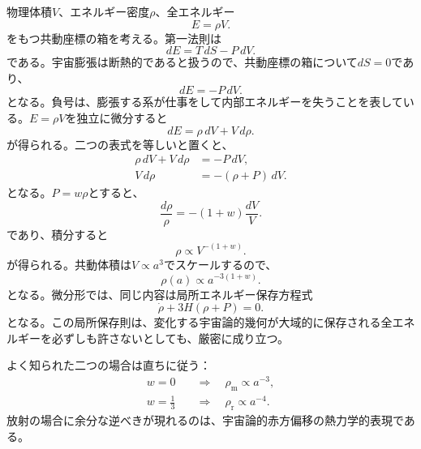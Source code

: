 物理体積\(V\)、エネルギー密度\(\rho\)、全エネルギー\begin{equation}
E=\rho V.
\end{equation}をもつ共動座標の箱を考える。第一法則は
\begin{equation}
dE=T\,dS-P\,dV.
\end{equation}
である。宇宙膨張は断熱的であると扱うので、共動座標の箱について\(dS=0\)であり、
\begin{equation}
dE=-P\,dV.
\label{eq:c04-adiabatic-first-law}
\end{equation}
となる。負号は、膨張する系が仕事をして内部エネルギーを失うことを表している。\(E=\rho V\)を独立に微分すると
\begin{equation}
dE=\rho\,dV+V\,d\rho.
\end{equation}
が得られる。二つの表式を等しいと置くと、
\begin{align}
\rho\,dV+V\,d\rho&=-P\,dV,\\
V\,d\rho&=-(\rho+P)\,dV.
\label{eq:c04-volume-continuity}
\end{align}
となる。\(P=w\rho\)とすると、
\begin{equation}
\frac{d\rho}{\rho}=-(1+w)\frac{dV}{V}.
\end{equation}
であり、積分すると
\begin{equation}
\rho\propto V^{-(1+w)}.
\end{equation}
が得られる。共動体積は\(V\propto a^3\)でスケールするので、
\begin{equation}
\boxed{\rho(a)\propto a^{-3(1+w)}}.
\label{eq:c04-density-scaling}
\end{equation}
となる。微分形では、同じ内容は局所エネルギー保存方程式
\begin{equation}
\dot\rho+3H(\rho+P)=0.
\label{eq:c04-continuity}
\end{equation}
となる。この局所保存則は、変化する宇宙論的幾何が大域的に保存される全エネルギーを必ずしも許さないとしても、厳密に成り立つ。

よく知られた二つの場合は直ちに従う：
\begin{align}
w=0
&\quad\Longrightarrow\quad
\rho_{\mathrm m}\propto a^{-3},\\
w=\frac13
&\quad\Longrightarrow\quad
\rho_{\mathrm r}\propto a^{-4}.
\end{align}
放射の場合に余分な逆べきが現れるのは、宇宙論的赤方偏移の熱力学的表現である。

\begin{classroomqa}
\end{classroomqa}

